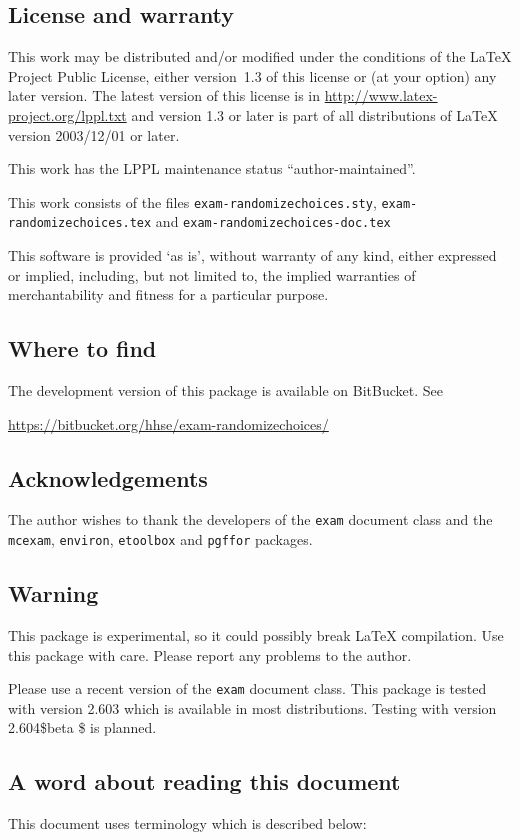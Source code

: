 \documentclass[12pt,a4paper]{exam}
\begin{document}
\subsection{License and warranty}
This work may be distributed and/or modified under the
conditions of the \LaTeX{} Project Public
License, either version~1.3 of this
license or (at your option) any later version.  The latest version
of this license is in \url{http://www.latex-project.org/lppl.txt}
and version 1.3 or later is part of all distributions of \LaTeX{}
version 2003/12/01 or later.

This work has the LPPL maintenance status ``author-maintained''.

This work consists of the files \texttt{exam-randomizechoices.sty},
\texttt{exam-randomizechoices.tex} and \texttt{exam-randomizechoices-doc.tex}

This software is provided `as is', without warranty of any kind,
either expressed or implied, including, but not limited to, the
implied warranties of merchantability and fitness for a
particular purpose.

\subsection{Where to find}
The development version of this package is available on BitBucket. See

\url{https://bitbucket.org/hhse/exam-randomizechoices/}

\subsection{Acknowledgements}
The author wishes to thank the developers of the \verb|exam| document
class and the \verb|mcexam|, \verb|environ|, \verb|etoolbox| and \verb|pgffor|
packages.

\subsection{Warning}
This package is experimental, so it could possibly break \LaTeX{}
compilation. Use this package with care. Please report any problems
to the author.

Please use a recent version of the \texttt{exam} document class. This
package is tested with version 2.603 which is available in most distributions.
Testing with version 2.604\$beta \$ is planned.

\subsection{A word about reading this document}
This document uses terminology which is described below:
\end{document}
